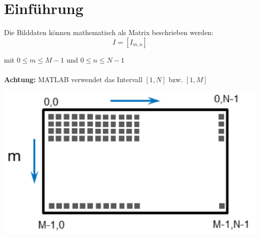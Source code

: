 



\chapter{Einführung}

Die Bilddaten können mathematisch als Matrix beschrieben werden:
\[
	I = \left[ I_{m,n} \right] 
\]
\begin{footnotesize}
	mit $0 \leq m \leq M-1$ und $0 \leq n \leq N-1$\\\\
	\textbf{Achtung:} MATLAB verwendet das Intervall $[1,N]$ bzw. $[1,M]$\\
\end{footnotesize}

\begin{center}
\includegraphics[scale=0.7]{./images/matrix_nomenklatur.png}
\end{center}
~\\\\

